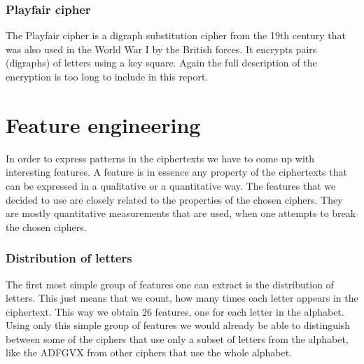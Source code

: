 \documentclass[a4paper]{article}
\begin{document}
\subsubsection{Playfair cipher}
The Playfair cipher is a digraph substitution cipher from the 19th century that was also used in the World War I by the British forces. It encrypts pairs (digraphs) of letters using a key square. Again the full description of the encryption is too long to include in this report.



\section{Feature engineering}
In order to express patterns in the ciphertexts we have to come up with interesting features. A feature is in essence any property of the ciphertexts that can be expressed in a qualitative or a quantitative way. The features that we decided to use are closely related to the properties of the chosen ciphers. They are mostly quantitative measurements that are used, when one attempts to break the chosen ciphers.

\subsubsection{Distribution of letters}
The first most simple group of features one can extract is the distribution of letters. This just means that we count, how many times each letter appears in the ciphertext. This way we obtain $26$ features, one for each letter in the alphabet. Using only this simple group of features we would already be able to distinguish between some of the ciphers that use only a subset of letters from the alphabet, like the ADFGVX from other ciphers that use the whole alphabet.
\end{document}

